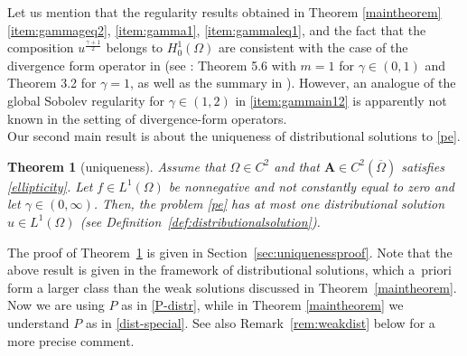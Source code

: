 \documentclass[12pt,a4paper]{amsart}
\newtheorem{theorem}{\bf Theorem}[section]
\theoremstyle{definition}
\newcommand{\A}{\mathbf{A}}
\begin{document}
 Let us mention that the regularity results obtained  in Theorem \ref{maintheorem} \ref{item:gammageq2}, \ref{item:gamma1}, \ref{item:gammaleq1}, and the fact that the composition $u^{\frac{\gamma +1}{2}}$ belongs to $H^1_0(\Omega)$
are consistent with the case of the divergence form operator in \cite{MR2592976}
(see \cite{MR2592976}: Theorem 5.6 with $m=1$ for $\gamma \in (0,1)$ and Theorem 3.2 
for $\gamma =1$, as well as the summary in \cite[page~27]{MR4860322}). However, an analogue of the global Sobolev regularity for $\gamma\in (1,2)$ in \ref{item:gammain12} is apparently not known in the setting of divergence-form operators.
\ \\

\noindent
Our second main result is about the uniqueness of distributional solutions to \eqref{pe}.

\begin{theorem}[uniqueness]\label{uniqregu} \label{theoremUniqness}  Assume that $\Omega \in C^{2}$ and that $\A\in C^{2}(\overline{\Omega})$ satisfies \eqref{ellipticity}. Let $f\in L^1(\Omega)$ be nonnegative and not constantly equal to zero and let $\gamma\in (0,\infty)$. Then, the problem \eqref{pe} has at most one distributional solution $u\in L^1(\Omega)$ (see Definition~\ref{def:distributionalsolution}).
\end{theorem}
The proof of Theorem~\ref{uniqregu} is given in Section~\ref{sec:uniquenessproof}. 
Note that the above result is given in the framework of distributional solutions, which a~priori form a larger class than the weak solutions discussed in Theorem~\ref{maintheorem}. 
Now we are using $P$ as in \eqref{P-distr}, while in Theorem \ref{maintheorem} we understand $P$ as in \eqref{dist-special}.
See also Remark~\ref{rem:weakdist} below for a more precise comment.
\end{document}
